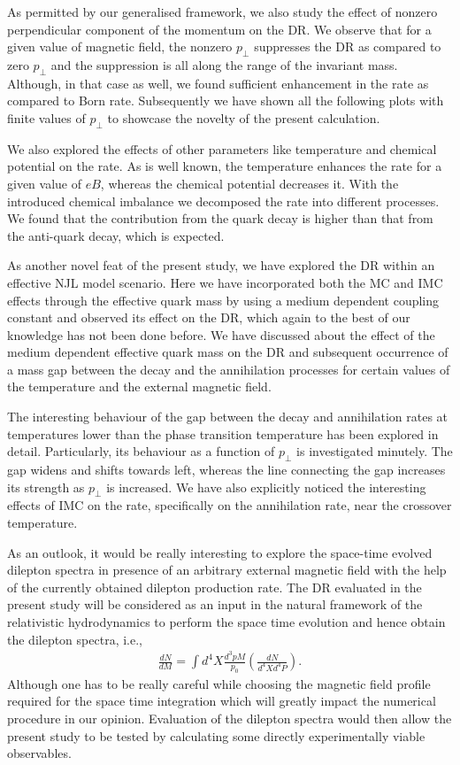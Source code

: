\documentclass[aps,prd,floatfix,showpacs,showkeys,superscriptadress,unsortedaddress,nofootinbib,onecolumn]{revtex4-1}
\newcommand{\sperp}{\scriptscriptstyle{\perp}}
\begin{document}
As permitted by our generalised framework, we also study the effect of nonzero perpendicular component of the momentum on the DR. We observe that for a given value of magnetic field, the nonzero $p_{\sperp}$ suppresses the DR as compared to zero $p_{\sperp}$ and the suppression is all along the range of the invariant mass. Although, in that case as well, we found sufficient enhancement in the rate as compared to Born rate. Subsequently we have shown all the following plots with finite values of $p_{\sperp}$ to showcase the novelty of the present calculation.

We also explored the effects of other parameters like temperature and chemical potential on the rate. As is well known, the temperature enhances the rate for a given value of $eB$, whereas the chemical potential decreases it. With the introduced chemical imbalance we decomposed the rate into different processes. We found that the contribution from the quark decay is higher than that from the anti-quark decay, which is expected.

As another novel feat of the present study, we have explored the DR within an effective NJL model scenario. Here we have incorporated both the MC and IMC effects through the effective quark mass by using a medium dependent coupling constant and observed its effect on the DR, which again to the best of our knowledge has not been done before. We have discussed about the effect of the medium dependent effective quark mass on the DR and subsequent occurrence of a mass gap between the decay and the annihilation processes for certain values of the temperature and the external magnetic field.  

The interesting behaviour of the gap between the decay and annihilation rates at temperatures lower than the phase transition temperature has been explored in detail. Particularly, its behaviour as a function of $p_{\sperp}$ is investigated minutely. The gap widens and shifts towards left, whereas the line connecting the gap increases its strength as $p_{\sperp}$ is increased. We have also explicitly noticed the interesting effects of IMC on the rate, specifically on the annihilation rate, near the crossover temperature.

As an outlook, it would be really interesting to explore the space-time evolved dilepton spectra in presence of an arbitrary external magnetic field with the help of the currently obtained dilepton production rate. The DR evaluated in the present study will be considered as an input in the natural framework of the relativistic hydrodynamics to perform the space time evolution and hence obtain the dilepton spectra, i.e., 
\begin{align}
    \frac{dN}{dM} = \int d^4X \frac{d^3p M}{p_0} \left(\frac{dN}{d^4X d^4P}\right).
\end{align} 
Although one has to be really careful while choosing the magnetic field profile required for the space time integration which will greatly impact the numerical procedure in our opinion. Evaluation of the dilepton spectra would then allow the present study to be tested by calculating some directly experimentally viable observables.
\end{document}
